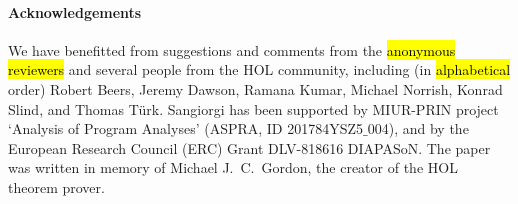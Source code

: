 \paragraph{Acknowledgements}

We have  benefitted from suggestions and comments 
from  the \hl{anonymous reviewers} and several people from the HOL
community, including (in \hl{alphabetical} order) Robert Beers, Jeremy Dawson,
Ramana Kumar,
Michael Norrish, 
Konrad Slind, and
Thomas T\"{u}rk.
%
Sangiorgi has been  supported by 
 MIUR-PRIN project `Analysis of
Program Analyses' (ASPRA, ID 201784YSZ5$\_$004), and by the 
European Research
Council (ERC) Grant DLV-818616 DIAPASoN.
The paper was written in memory of Michael J.~C.~Gordon, the creator of the HOL theorem prover.

